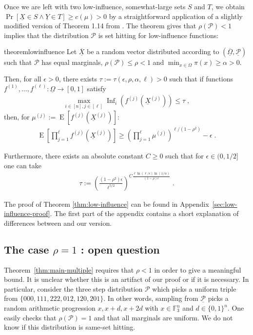 \documentclass{daj}
\newcommand{\1}{\mathbbm{1}}
\theoremstyle{plain}
\theoremstyle{definition}
\DeclareMathOperator*{\EE}{E}
\DeclareMathOperator{\Inf}{Inf}
\newcommand{\cP}{\mathcal{P}}
\begin{document}
Once we are left with two low-influence, somewhat-large sets $S$
and $T$, we 
obtain
$\Pr[\underline{X} \in S \land \underline{Y} \in T] \ge c(\mu) > 0$
by a straightforward application of a slightly
modified version of Theorem 1.14 from \cite{Mos10}.
The theorem gives that $\rho(\mathcal{P}) < 1$ implies that
the distribution $\mathcal{P}$ is set hitting for low-influence functions:

\begin{restatable}{theorem}{lowinfluence}
\label{thm:low-influence}
Let $\overline{\underline{X}}$ be a random vector distributed
according to $(\overline{\underline{\Omega}}, \underline{\mathcal{P}})$ 
such that $\cP$ has equal marginals, $\rho(\mathcal{P}) \le \rho < 1$
and $\min_{x \in \Omega} \pi(x) \ge \alpha > 0$.

Then, for all $\epsilon > 0$, there exists 
$\tau := \tau(\epsilon, \rho, \alpha, \ell) > 0$
such that if functions 
$f^{(1)}, \ldots, f^{(\ell)}: \underline{\Omega} \to [0, 1]$ satisfy
\begin{align}
\max_{i \in [n], j \in [\ell]} \Inf_i(f^{(j)}(\underline{X}^{(j)})) \le \tau\;,
\end{align}
then, for $\mu^{(j)} := \EE[f^{(j)}(\underline{X}^{(j)})]$:
\begin{align}
\EE \left[ \prod_{j=1}^{\ell} f^{(j)}(\underline{X}^{(j)}) \right] 
\ge \left( \prod_{j=1}^\ell \mu^{(j)} \right)^{\ell / (1-\rho^2)} - \epsilon \; .
\end{align}

Furthermore, there exists an absolute constant $C \ge 0$ such that
for $\epsilon \in (0, 1/2]$ one can take
\begin{align}\label{eq:38a}
\tau := \left(\frac{(1-\rho^2)\epsilon}{\ell^{5/2}}
\right)^{C \frac{\ell \ln(\ell/\epsilon)\ln(1/\alpha)}{(1-\rho)\epsilon}} 
\; .
\end{align}
\end{restatable}

The proof of Theorem \ref{thm:low-influence} can be found in
Appendix~\ref{sec:low-influence-proof}.
The first part of the appendix contains a short
explanation of differences
between \cite{Mos10} and our version.

\subsection{The case
\texorpdfstring{$\rho = 1$}{rho = 1}
: open question}
\label{sec:open}

Theorem~\ref{thm:main-multiple} requires that $\rho < 1$ in order to give a
meaningful bound.  It is unclear whether this is an artifact of our proof or if
it is necessary.  In particular, consider the three step distribution $\mathcal{P}$ 
which
picks a uniform triple from
$\{000, 111, 222, 012, 120, 201\}$.
In other words, sampling from $\underline{\cP}$ picks a random
arithmetic progression $x, x+d, x+2d$ with $x \in \mathbb{F}_3^n$
and $d \in \{0,1\}^n$.
One easily
checks that $\rho(\mathcal{P})=1$ and that all marginals are uniform.
We do not know if this distribution is same-set hitting.
\end{document}
